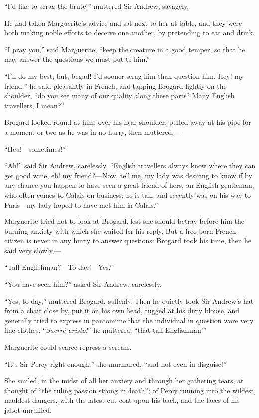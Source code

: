 \documentclass[paper=a5,BCOR=7mm,twoside,DIV=calc,12pt,usegeometry,chapterprefix,endperiod,headings=big]{scrbook}
\begin{document}
\enquote{I'd like to scrag the brute!} muttered Sir Andrew, savagely.

He had taken Marguerite's advice and sat next to her at table, and they were both making noble efforts to deceive one another, by pretending to eat and drink.

\enquote{I pray you,} said Marguerite, \enquote{keep the creature in a good temper, so that he may answer the questions we must put to him.}

\enquote{I'll do my best, but, begad! I'd sooner scrag him than question him. Hey! my friend,} he said pleasantly in French, and tapping Brogard lightly on the shoulder, \enquote{do you see many of our quality along these parts? Many English travellers, I mean?}

Brogard looked round at him, over his near shoulder, puffed away at his pipe for a moment or two as he was in no hurry, then muttered,---

\enquote{Heu!---sometimes!}

\enquote{Ah!} said Sir Andrew, carelessly, \enquote{English travellers always know where they can get good wine, eh! my friend?---Now, tell me, my lady was desiring to know if by any chance you happen to have seen a great friend of hers, an English gentleman, who often comes to Calais on business; he is tall, and recently was on his way to Paris---my lady hoped to have met him in Calais.}

Marguerite tried not to look at Brogard, lest she should betray before him the burning anxiety with which she waited for his reply. But a free-born French citizen is never in any hurry to answer questions: Brogard took his time, then he said very slowly,---

\enquote{Tall Englishman?---To-day!---Yes.}

\enquote{You have seen him?} asked Sir Andrew, carelessly.

\enquote{Yes, to-day,} muttered Brogard, sullenly. Then he quietly took Sir Andrew's hat from a chair close by, put it on his own head, tugged at his dirty blouse, and generally tried to express in pantomime that the individual in question wore very fine clothes. \enquote{\textit{Sacrré aristo!}} he muttered, \enquote{that tall Englishman!}

Marguerite could scarce repress a scream.

\enquote{It's Sir Percy right enough,} she murmured, \enquote{and not even in disguise!}

She smiled, in the midst of all her anxiety and through her gathering tears, at thought of \enquote{the ruling passion strong in death}; of Percy running into the wildest, maddest dangers, with the latest-cut coat upon his back, and the laces of his jabot unruffled.
\end{document}

